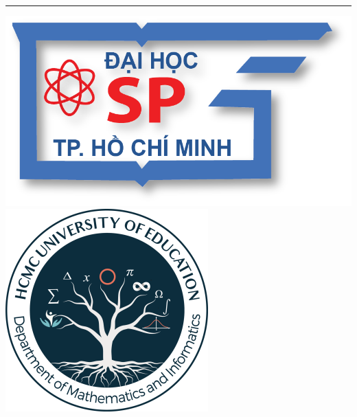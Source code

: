 \documentclass[12pt, %
oneside, %
singlespacing, %
headsepline, %
]{ThesisHCMUE}
\author{NGUYỄN VĂN A.}
\begin{document}
\frontmatter %

\pagestyle{plain}


\begin{titlepage}
\border{1in} %

\begin{center}
\\ %

\\ %

\\ %
\rule{6cm}{1pt}

\vspace{1cm} %
\includegraphics[scale=0.2]{logo/logo.png}\hspace{1cm}
\includegraphics[scale=0.5]{logo/logokhoa.png}


\end{center}
\end{titlepage}
\end{document}
